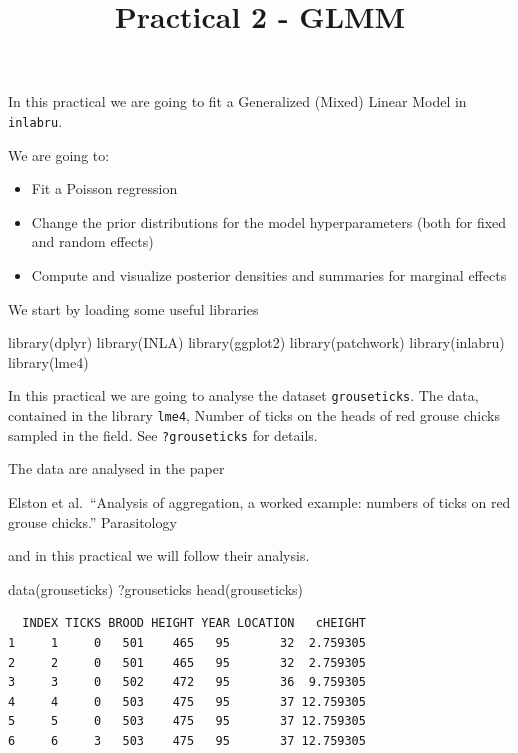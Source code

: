 \documentclass[
  letterpaper,
  DIV=11,
  numbers=noendperiod]{scrartcl}
\title{Practical 2 - GLMM}
\author{}
\date{}
\makeatletter
\newenvironment{Shaded}{\begin{snugshade}}{\end{snugshade}}
\newcommand{\FunctionTok}[1]{\textcolor[rgb]{0.28,0.35,0.67}{#1}}
\newcommand{\NormalTok}[1]{\textcolor[rgb]{0.00,0.23,0.31}{#1}}
\providecommand{\tightlist}{%
  \setlength{\itemsep}{0pt}\setlength{\parskip}{0pt}}
\renewcommand{\maketitle}{\bgroup\setlength{\parindent}{0pt}
\begin{flushleft}
  {\sffamily\huge\textbf{\MakeUppercase{\@title}}} \vspace{0.3cm} \newline
  {\Large {\@subtitle}} \newline
  \@author
\end{flushleft}\egroup
}
\makeatother
\begin{document}
\maketitle

\pagestyle{mystyle}


In this practical we are going to fit a Generalized (Mixed) Linear Model
in \texttt{inlabru}.

We are going to:

\begin{itemize}
\tightlist
\item
  Fit a Poisson regression
\item
  Change the prior distributions for the model hyperparameters (both for
  fixed and random effects)
\item
  Compute and visualize posterior densities and summaries for marginal
  effects
\end{itemize}

We start by loading some useful libraries

\begin{Shaded}
\begin{Highlighting}[]
\FunctionTok{library}\NormalTok{(dplyr)}
\FunctionTok{library}\NormalTok{(INLA)}
\FunctionTok{library}\NormalTok{(ggplot2)}
\FunctionTok{library}\NormalTok{(patchwork)}
\FunctionTok{library}\NormalTok{(inlabru)     }
\FunctionTok{library}\NormalTok{(lme4)}
\end{Highlighting}
\end{Shaded}

In this practical we are going to analyse the dataset
\texttt{grouseticks}. The data, contained in the library \texttt{lme4},
Number of ticks on the heads of red grouse chicks sampled in the field.
See \texttt{?grouseticks} for details.

The data are analysed in the paper

Elston et al.~``Analysis of aggregation, a worked example: numbers of
ticks on red grouse chicks.'' Parasitology

and in this practical we will follow their analysis.

\begin{Shaded}
\begin{Highlighting}[]
\FunctionTok{data}\NormalTok{(grouseticks)}
\NormalTok{?grouseticks}
\FunctionTok{head}\NormalTok{(grouseticks)}
\end{Highlighting}
\end{Shaded}

\begin{verbatim}
  INDEX TICKS BROOD HEIGHT YEAR LOCATION   cHEIGHT
1     1     0   501    465   95       32  2.759305
2     2     0   501    465   95       32  2.759305
3     3     0   502    472   95       36  9.759305
4     4     0   503    475   95       37 12.759305
5     5     0   503    475   95       37 12.759305
6     6     3   503    475   95       37 12.759305
\end{verbatim}
\end{document}
